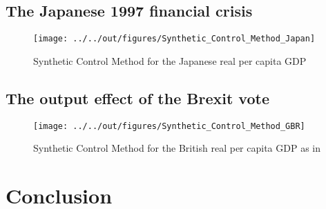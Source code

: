 \documentclass[11pt, a4paper, leqno]{article}
\begin{document}
\subsection{The Japanese 1997 financial crisis}
\label{Japan}


\begin{figure} [h]
    \caption{Synthetic Control Method for the Japanese real per capita GDP}
    
    \texttt{[image: ../../out/figures/Synthetic\_Control\_Method\_Japan]}

\end{figure}

\subsection{The output effect of the Brexit vote}
\label{Brexit}

\begin{figure} [h]
    \caption{Synthetic Control Method for the British real per capita GDP as in \citet{Born2018}}
    
    \texttt{[image: ../../out/figures/Synthetic\_Control\_Method\_GBR]}

\end{figure}


\section{Conclusion}


\newpage






\end{document}
